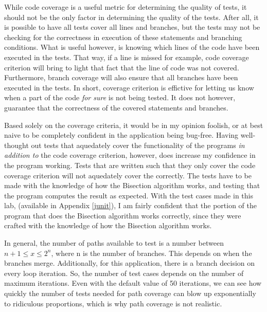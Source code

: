 While code coverage is a useful metric for determining the quality of tests, it
should not be the only factor in determining the quality of the tests. After
all, it is possible to have all tests cover all lines and branches, but the
tests may not be checking for the correctness in execution of these statements
and branching conditions.  What is useful however, is knowing which lines of
the code have been executed in the tests. That way, if a line is missed for
example, code coverage criterion will bring to light that fact that the line of
code was not covered. Furthermore, branch coverage will also ensure that all
branches have been executed in the tests. In short, coverage criterion is
effictive for letting us know when a part of the code \textit{for sure} is not
being tested. It does not however, guarantee that the correctness of the
covered statements and branches.

Based solely on the coverage criteria, it would be in my opinion foolish,
or at best naive to be completely confident in the application being bug-free.
Having well-thought out tests that aquedately cover the functionality of the
programs \textit{in addition to} the code coverage criterion, however, does
increase my confidence in the program working. Tests that are written such that 
they only cover the code coverage criterion will not aquedately cover the 
correctly. The tests have to be made with the knowledge of how the Bisection
algorithm works, and testing that the program computes the result as expected.
With the test cases made in this lab, (available in Appendix \ref{junit}),
I am fairly confident that the portion of the program that does the Bisection
algorithm works correctly, since they were crafted with the knowledge
of how the Bisection algorithm works. 

In general, the number of paths available to test is a number between
$n+1 \leq x \leq 2^n$, where n is the number of branches. This depends
on when the branches merge. Additionally, for this application,
there is a branch decision on every loop iteration. So, the number of test
cases depends on the number of maximum iterations. Even with the default value
of 50 iterations, we can see how quickly the number of tests needed for path
coverage can blow up exponentially to ridiculous proportions, which is why
path coverage is not realistic. 
